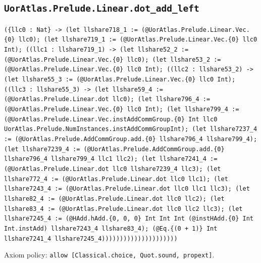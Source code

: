 \documentclass[11pt]{article}
\begin{document}
\subsection*{\texttt{UorAtlas.Prelude.Linear.dot\_add\_left}}
\noindent\texttt{(\{llc0 : Nat\} -> (let llshare718\_1 := (@UorAtlas.Prelude.Linear.Vec.\{0\} llc0); (let llshare719\_1 := (@UorAtlas.Prelude.Linear.Vec.\{0\} llc0 Int); ((llc1 : llshare719\_1) -> (let llshare52\_2 := (@UorAtlas.Prelude.Linear.Vec.\{0\} llc0); (let llshare53\_2 := (@UorAtlas.Prelude.Linear.Vec.\{0\} llc0 Int); ((llc2 : llshare53\_2) -> (let llshare55\_3 := (@UorAtlas.Prelude.Linear.Vec.\{0\} llc0 Int); ((llc3 : llshare55\_3) -> (let llshare59\_4 := (@UorAtlas.Prelude.Linear.dot llc0); (let llshare796\_4 := (@UorAtlas.Prelude.Linear.Vec.\{0\} llc0 Int); (let llshare799\_4 := (@UorAtlas.Prelude.Linear.Vec.instAddCommGroup.\{0\} Int llc0 UorAtlas.Prelude.NumInstances.instAddCommGroupInt); (let llshare7237\_4 := (@UorAtlas.Prelude.AddCommGroup.add.\{0\} llshare796\_4 llshare799\_4); (let llshare7239\_4 := (@UorAtlas.Prelude.AddCommGroup.add.\{0\} llshare796\_4 llshare799\_4 llc1 llc2); (let llshare7241\_4 := (@UorAtlas.Prelude.Linear.dot llc0 llshare7239\_4 llc3); (let llshare772\_4 := (@UorAtlas.Prelude.Linear.dot llc0 llc1); (let llshare7243\_4 := (@UorAtlas.Prelude.Linear.dot llc0 llc1 llc3); (let llshare82\_4 := (@UorAtlas.Prelude.Linear.dot llc0 llc2); (let llshare83\_4 := (@UorAtlas.Prelude.Linear.dot llc0 llc2 llc3); (let llshare7245\_4 := (@HAdd.hAdd.\{0, 0, 0\} Int Int Int (@instHAdd.\{0\} Int Int.instAdd) llshare7243\_4 llshare83\_4); (@Eq.\{(0 + 1)\} Int llshare7241\_4 llshare7245\_4)))))))))))))))))))))}\par
\noindent Axiom policy: \texttt{allow [Classical.choice, Quot.sound, propext]}.\par
\end{document}
